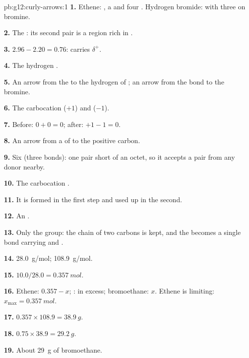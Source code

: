 \begin{solution}{pb:g12:curly-arrows:1}
\textbf{1.} Ethene: , a  and four .
Hydrogen bromide:  with three  on bromine.

\textbf{2.} The : its second pair is a region rich in
.

\textbf{3.} $2.96 - 2.20 = 0.76$:  carries $\delta^+$.

\textbf{4.} The hydrogen .

\textbf{5.} An arrow from the  to the hydrogen of ;
an arrow from the  bond to the bromine.

\textbf{6.} The carbocation  ($+1$) and  ($-1$).

\textbf{7.} Before: $0 + 0 = 0$; after: $+1 - 1 = 0$.

\textbf{8.} An arrow from a  of  to the positive
carbon.

\textbf{9.} Six (three bonds): one pair short of an octet, so it accepts
a pair from any donor nearby.

\textbf{10.} The carbocation .

\textbf{11.} It is formed in the first step and used up in the second.

\textbf{12.} An .

\textbf{13.} Only the group: the chain of two carbons is kept, and the
 becomes a single bond carrying  and .

\textbf{14.} \qty{28.0}{g/mol}; \qty{108.9}{g/mol}.

\textbf{15.} $10.0 / 28.0 = \qty{0.357}{mol}$.

\textbf{16.} Ethene: $0.357 - x$; : in excess; bromoethane: $x$.
Ethene is limiting: $x_{\max} = \qty{0.357}{mol}$.

\textbf{17.} $0.357 \times 108.9 = \qty{38.9}{g}$.

\textbf{18.} $0.75 \times 38.9 = \qty{29.2}{g}$.

\textbf{19.} About \qty{29}{g} of bromoethane.
\end{solution}
